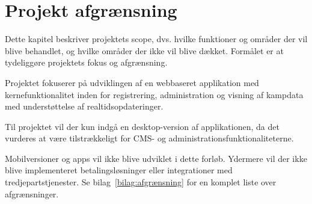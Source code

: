 \section{Projekt afgrænsning}
Dette kapitel beskriver projektets scope, dvs. hvilke funktioner og områder der vil blive behandlet, og hvilke områder
der ikke vil blive dækket. Formålet er at tydeliggøre projektets fokus og afgrænsning.

Projektet fokuserer på udviklingen af en webbaseret applikation med kernefunktionalitet inden for registrering,
administration og visning af kampdata med understøttelse af realtidsopdateringer.

Til projektet vil der kun indgå en desktop-version af applikationen, da det vurderes at være tilstrækkeligt
for CMS- og administrationsfunktionaliteterne.

Mobilversioner og apps vil ikke blive udviklet i dette forløb.
Ydermere vil der ikke blive implementeret betalingsløsninger eller integrationer med tredjepartstjenester.
Se bilag~\ref{bilag:afgrænsning} for en komplet liste over afgrænsninger.
